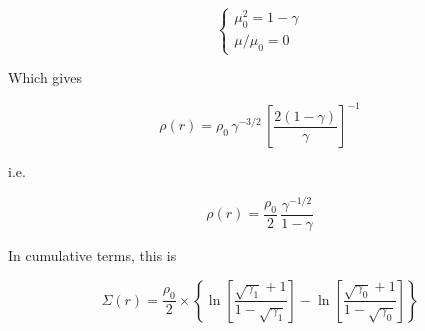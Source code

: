 \documentclass[11pt]{article}
\begin{document}
\begin{equation}
\left\{\begin{array}{l}\mu_0^2 = 1-\gamma \\\displaystyle\mu/\mu_0 = 0\end{array}\right.\end{equation}


Which gives

\begin{equation}
\rho(r) = \rho_0\,\gamma^{-3/2}\,\left[\frac{2(1-\gamma)}{\gamma}\right]^{-1}
\end{equation}

i.e.

\begin{equation}
\rho(r) = \frac{\rho_0}{2}\,\frac{\gamma^{-1/2}}{1-\gamma}
\end{equation}

In cumulative terms, this is

\begin{equation}
\Sigma(r) = \frac{\rho_0}{2} \times \left\{ \ln{\left[\frac{\sqrt{\gamma_1}+1}{1-\sqrt{\gamma_1}}\right]} - \ln{\left[\frac{\sqrt{\gamma_0}+1}{1-\sqrt{\gamma_0}}\right]} \right\}
\end{equation}
\end{document}
